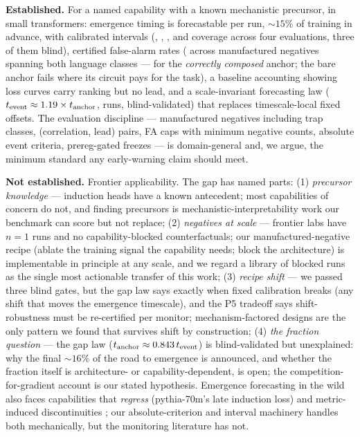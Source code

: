 \documentclass[11pt]{article}
\newcommand{\tev}{t_{\mathrm{event}}}
\begin{document}
\textbf{Established.} For a named capability with a known mechanistic precursor, in
small transformers: emergence timing is forecastable per run, ${\sim}15\%$ of training
in advance, with calibrated intervals (\wConfCover, \wGateCover, \wGateCcover, and
\wNineCover{} coverage across four evaluations, three of them blind), certified
false-alarm rates (\wNegConjFA{} across \wNegTotal{} manufactured negatives spanning both
language classes ---
for the \emph{correctly composed} anchor; the bare anchor fails \wTrapBareFA{} where its
circuit pays for the task), a baseline accounting showing loss curves carry ranking but
no lead, and a scale-invariant forecasting law ($\tev \approx \wLawMult \times
t_{\mathrm{anchor}}$, \wLawN{} runs, blind-validated) that replaces timescale-local
fixed offsets. The evaluation discipline --- manufactured negatives including trap
classes, (correlation, lead) pairs, FA caps with minimum negative counts, absolute event
criteria, prereg-gated freezes --- is domain-general and, we argue, the minimum standard
any early-warning claim should meet.

\textbf{Not established.} Frontier applicability. The gap has named parts:
(1) \emph{precursor knowledge} --- induction heads have a known antecedent; most
capabilities of concern do not, and finding precursors is mechanistic-interpretability
work our benchmark can score but not replace; (2) \emph{negatives at scale} --- frontier
labs have $n{=}1$ runs and no capability-blocked counterfactuals; our manufactured-negative
recipe (ablate the training signal the capability needs; block the architecture) is
implementable in principle at any scale, and we regard a library of blocked runs as the
single most actionable transfer of this work; (3) \emph{recipe shift} --- we passed three
blind gates, but the gap law says exactly when fixed calibration breaks (any shift that
moves the emergence timescale), and the P5 tradeoff says shift-robustness must be
re-certified per monitor; mechanism-factored designs are the only pattern we found that
survives shift by construction; (4) \emph{the fraction question} --- the gap law
($t_{\mathrm{anchor}} \approx \wLawFrac\,\tev$) is blind-validated but unexplained: why
the final ${\sim}16\%$ of the road to emergence is announced, and whether the fraction
itself is architecture- or capability-dependent, is open; the competition-for-gradient
account is our stated hypothesis.
Emergence forecasting in the wild also faces capabilities that \emph{regress}
(pythia-70m's late induction loss) and metric-induced discontinuities
\citep{schaeffer2023mirage}; our absolute-criterion and interval machinery handles
both mechanically, but the monitoring literature has not.
\end{document}
